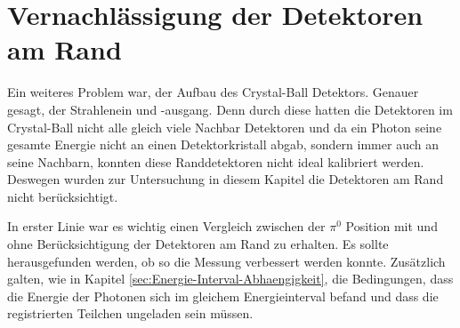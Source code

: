 \documentclass[a4paper,11pt,oneside,final,german,openbib,pdftex]{scrbook}
\begin{document}
\section{Vernachl\"assigung der Detektoren am Rand}
\label{sec:Varnachlaessigung-der-Detektoren-am-Rand}

Ein weiteres Problem war, der Aufbau des Crystal-Ball Detektors. Genauer gesagt, der Strahlenein und -ausgang. Denn durch diese hatten die Detektoren im Crystal-Ball nicht alle gleich viele Nachbar Detektoren und da ein Photon seine gesamte Energie nicht an einen Detektorkristall abgab, sondern immer auch an seine Nachbarn, konnten diese Randdetektoren nicht ideal kalibriert werden. Deswegen wurden zur Untersuchung in diesem Kapitel die Detektoren am Rand nicht ber\"ucksichtigt. 



In erster Linie war es wichtig einen Vergleich zwischen der $\pi^0$ Position mit und ohne Ber\"ucksichtigung der Detektoren am Rand zu erhalten. Es sollte herausgefunden werden, ob so die Messung verbessert werden konnte. Zus\"atzlich galten, wie in Kapitel \ref{sec:Energie-Interval-Abhaengigkeit}, die Bedingungen, dass die Energie der Photonen sich im gleichem Energieinterval befand und dass die registrierten Teilchen ungeladen sein m\"ussen. 

\end{document}
